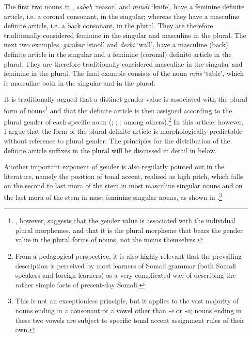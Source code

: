 \documentclass[output=paper]{langsci/langscibook}
\begin{document}
The first two nouns in , \textit{sabab} ‘reason’ and \textit{mindi} ‘knife’, have a feminine definite article, i.e. a coronal consonant, in the singular; whereas they have a masculine definite article, i.e. a back consonant, in the plural. They are therefore traditionally considered feminine in the singular and masculine in the plural. The next two examples, \textit{gambar} ‘stool’ and \textit{derbi} ‘wall’, have a masculine (back) definite article in the singular and a feminine (coronal) definite article in the plural. They are therefore traditionally considered masculine in the singular and feminine in the plural. The final example consists of the noun \textit{miis} ‘table’, which is masculine both in the singular and in the plural.

It is traditionally argued that a distinct gender value is associated with the plural form of nouns\footnote{\citet{Lecarme2002}, however, suggests that the gender value is associated with the individual plural morphemes, and that it is the plural morpheme that bears the gender value in the plural forms of nouns, not the nouns themselves.} and that the definite article is then assigned according to the plural gender of each specific noun (\citealt{ElSolamiMewis1988}; \citealt[54--55]{Saeed1999}; \citealt[48--49]{Berchem2012}; among others).\footnote{From a pedagogical perspective, it is also highly relevant that the prevailing description is perceived by most learners of Somali grammar (both Somali speakers and foreign learners) as a very complicated way of describing the rather simple facts of present-day Somali.}  In this article, however, I argue that the form of the plural definite article is morphologically predictable without reference to plural gender. The principles for the distribution of the definite article suffixes in the plural will be discussed in detail in  below.

Another important exponent of gender is also regularly pointed out in the literature, namely the position of tonal accent, realised as high pitch, which falls on the second to last mora of the stem in most masculine singular nouns and on the last mora of the stem in most feminine singular nouns, as shown in .\footnote{This is not an exceptionless principle, but it applies to the vast majority of nouns ending in a consonant or a vowel other than \textit{-e} or \textit{-o}; nouns ending in these two vowels are subject to specific tonal accent assignment rules of their own.}
 
\end{document}
